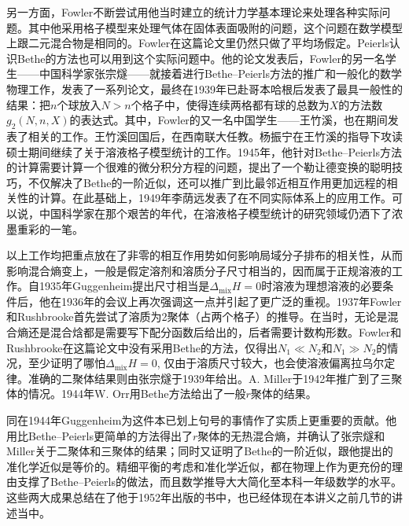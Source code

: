 \documentclass[main.tex]{subfiles}
\begin{document}
另一方面，Fowler不断尝试用他当时建立的统计力学基本理论来处理各种实际问题。其中他采用格子模型来处理气体在固体表面吸附的问题\cite{Fowler1936}，这个问题在数学模型上跟二元混合物是相同的。Fowler在这篇论文里仍然只做了平均场假定。Peierls认识Bethe的方法也可以用到这个实际问题中\cite{Peierls1936a}。他的论文发表后，Fowler的另一名学生——中国科学家张宗燧——就接着进行Bethe--Peierls方法的推广和一般化的数学物理工作，发表了一系列论文\cite{Chang1938,Chang1939}，最终在1939年已赴哥本哈根后发表了最具一般性的结果：把$n$个球放入$N>n$个格子中，使得连续两格都有球的总数为$X$的方法数$g_2\left(N,n,X\right)$的表达式\cite{Chang1939b}。其中，Fowler的又一名中国学生——王竹溪，也在期间发表了相关的工作\cite{Wang1937}。王竹溪回国后，在西南联大任教。杨振宁在王竹溪的指导下攻读硕士期间继续了关于溶液格子模型统计的工作\cite{Yang1983}。1945年，他针对Bethe--Peierls方法的计算需要计算一个很难的微分积分方程的问题，提出了一个勒让德变换的聪明技巧，不仅解决了Bethe的一阶近似，还可以推广到比最邻近相互作用更加远程的相关性的计算\cite{Yang1945}。在此基础上，1949年李荫远发表了在不同实际体系上的应用工作\cite{Li1949}。可以说，中国科学家在那个艰苦的年代，在溶液格子模型统计的研究领域仍洒下了浓墨重彩的一笔。

以上工作均把重点放在了非零的相互作用势如何影响局域分子排布的相关性，从而影响混合熵变上，一般是假定溶剂和溶质分子尺寸相当的，因而属于正规溶液的工作。自1935年Guggenheim提出尺寸相当是$\Delta_\text{mix}H=0$时溶液为理想溶液的必要条件后，他在1936年的会议上再次强调这一点\cite{Guggenheim1937}并引起了更广泛的重视。1937年Fowler和Rushbrooke首先尝试了溶质为2聚体（占两个格子）的推导\cite{Fowler1937}。在当时，无论是混合熵还是混合焓都是需要写下配分函数后给出的，后者需要计数构形数。Fowler和Rushbrooke在这篇论文中没有采用Bethe的方法，仅得出$N_1\ll N_2$和$N_1\gg N_2$的情况，至少证明了哪怕$\Delta_\text{mix}H=0$, 仅由于溶质尺寸较大，也会使溶液偏离拉乌尔定律。准确的二聚体结果则由张宗燧于1939年给出\cite{Chang1939a}。A. Miller于1942年推广到了三聚体的情况\cite{Miller1942,Miller1943}。1944年W. Orr用Bethe方法给出了一般$r$聚体的结果\cite{Orr1944}。

同在1944年Guggenheim为这件本已划上句号的事情作了实质上更重要的贡献。他用比Bethe--Peierls更简单的方法得出了$r$聚体的无热混合熵，并确认了张宗燧和Miller关于二聚体和三聚体的结果\cite{Guggenheim1944}；同时又证明了Bethe的一阶近似，跟他提出的准化学近似是等价的\cite{Guggenheim1944a}。精细平衡的考虑和准化学近似，都在物理上作为更充份的理由支撑了Bethe--Peierls的做法，而且数学推导大大简化至本科一年级数学的水平。这些两大成果总结在了他于1952年出版的书中\cite{Guggenheim1952}，也已经体现在本讲义之前几节的讲述当中。
\end{document}
